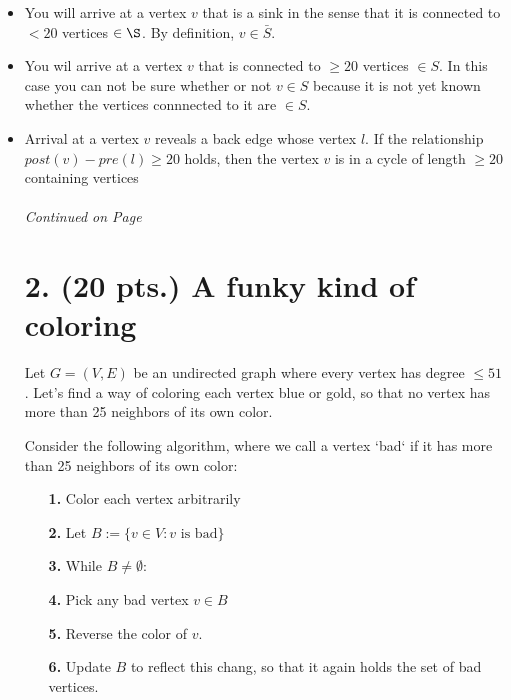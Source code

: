 \documentclass[11pt]{article}
\begin{document}
\begin{itemize}
\item You will arrive at a vertex $v$ that is a sink in the sense that it is connected to 
$< 20$ vertices $\in \S$. By definition, $v \in \bar{S}$.

\item You wil arrive at a vertex $v$ that is connected to $\geq 20$ vertices $\in S$. 
In this case you can not be sure whether or not $v\in S$ because it is not yet known
whether the vertices connnected to it are $\in S$.

\item Arrival at a vertex $v$ reveals a back edge whose vertex $l$. If the relationship
$post(v) - pre(l) \geq 20$ holds, then the vertex $v$ is in a cycle of length $\geq 20$ 
containing vertices   

\label{pg:end-of-p1}
%
\paragraph{} \emph{Continued on Page \pageref{pg:p1-continuation}}

\newpage

\pagestyle{plain}

\section*{2. (20 pts.) A funky kind of coloring}

Let $G = (V,E)$ be an undirected graph where every vertex has degree $\leq 51$. 
Let's find a way of coloring each vertex blue or gold, so that no vertex
has more than 25 neighbors of its own color.

Consider the following algorithm, where we call a vertex `bad` if it
has more than 25 neighbors of its own color:

\begin{itemize}  
\item[{\bf 1.}] Color each vertex arbitrarily 
\item[{\bf 2.}] Let $B := \{v \in V : v \mbox{ is bad}\}$
\item[{\bf 3.}] While $B \not= \emptyset:$
\item[{\bf 4.}] \hspace{4 pt}    Pick any bad vertex $v \in B$
\item[{\bf 5.}] \hspace{4 pt}    Reverse the color of $v$.
\item[{\bf 6.}] \hspace{4 pt}    Update $B$ to reflect this chang,
so that it again holds the set of bad vertices.
\end{itemize}


\end{itemize}
\end{document}
